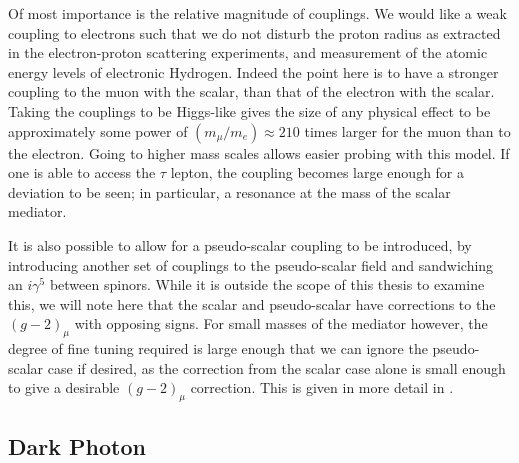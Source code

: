 Of most importance is the relative magnitude of couplings.
We would like a weak coupling to electrons such that we do not disturb the proton radius as extracted in the electron-proton scattering experiments, and measurement of the atomic energy levels of electronic Hydrogen.
Indeed the point here is to have a stronger coupling to the muon with the scalar, than that of the electron with the scalar.
Taking the couplings to be Higgs-like gives the size of any physical effect to be approximately some power of $(m_\mu/m_e) \approx 210$ times larger for the muon than to the electron.
Going to higher mass scales allows easier probing with this model.
If one is able to access the $\tau$ lepton, the coupling becomes large enough for a deviation to be seen; in particular, a resonance at the mass of the scalar mediator.

It is also possible to allow for a pseudo-scalar coupling to be introduced, by introducing another set of couplings to the pseudo-scalar field and sandwiching an $i\gamma^5$ between spinors.
While it is outside the scope of this thesis to examine this, we will note here that the scalar and pseudo-scalar have corrections to the $(g-2)_\mu$ with opposing signs.
For small masses of the mediator however, the degree of fine tuning required is large enough that we can ignore the pseudo-scalar case if desired, as the correction from the scalar case alone is small enough to give a desirable $(g-2)_\mu$ correction.
This is given in more detail in \cite{Carlson:2015jba}.

\subsection{Dark Photon}


